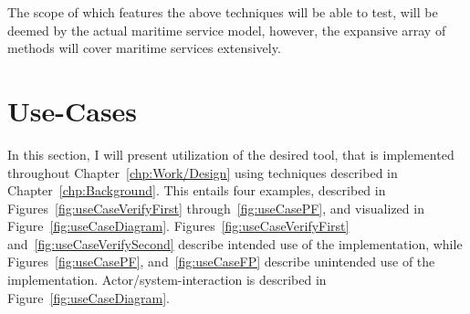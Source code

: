 The scope of which features the above techniques will be able to test, will be deemed by the actual maritime service model, however, the expansive array of methods will cover maritime services extensively.
\section{Use-Cases}
In this section, I will present utilization of the desired tool, that is implemented throughout Chapter~\ref{chp:Work/Design} using techniques described in Chapter~\ref{chp:Background}. This entails four examples, described in Figures~\ref{fig:useCaseVerifyFirst} through~\ref{fig:useCasePF}, and visualized in Figure~\ref{fig:useCaseDiagram}. Figures~\ref{fig:useCaseVerifyFirst} and~\ref{fig:useCaseVerifySecond} describe intended use of the implementation, while Figures~\ref{fig:useCasePF}, and~\ref{fig:useCaseFP} describe unintended use of the implementation. Actor/system-interaction is described in Figure~\ref{fig:useCaseDiagram}.

